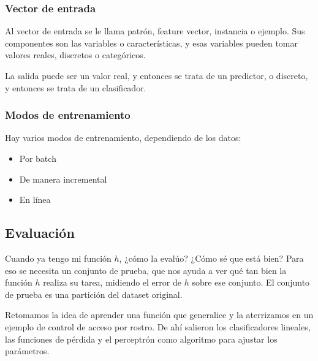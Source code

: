 \documentclass[11pt,letterpaper]{article}
\begin{document}
\subsubsection*{Vector de entrada}

Al vector de entrada se le llama patrón, feature vector, instancia o
ejemplo. Sus componentes son las variables o características, y esas
variables pueden tomar valores reales, discretos o categóricos.

La salida puede ser un valor real, y entonces se trata de un
predictor, o discreto, y entonces se trata de un clasificador.

\subsubsection*{Modos de entrenamiento}

Hay varios modos de entrenamiento, dependiendo de los datos:

\begin{itemize}[itemsep=0.1em]
    \item Por batch
    \item De manera incremental
    \item En línea
\end{itemize}


\subsection*{Evaluación}

Cuando ya tengo mi función $h$, ¿cómo la evalúo? ¿Cómo sé que está
bien? Para eso se necesita un conjunto de prueba, que nos ayuda a ver
qué tan bien la función $h$ realiza su tarea, midiendo el error de $h$
sobre ese conjunto. El conjunto de prueba es una partición del dataset
original.

\newpage



\begin{quick_sum}
  Retomamos la idea de aprender una función que generalice y la
  aterrizamos en un ejemplo de control de acceso por rostro. De ahí
  salieron los clasificadores lineales, las funciones de pérdida y el
  perceptrón como algoritmo para ajustar los parámetros.
\end{quick_sum}
\end{document}
